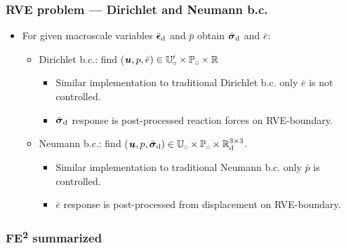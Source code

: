 \documentclass[11pt]{beamer} %
\renewcommand{\dev}{\mathrm{d}}
\newcommand{\rve}{
  {\mathchoice
   {\mbox{\scalebox{0.67}{$\Box$}}}
   {\mbox{\scalebox{0.67}{$\Box$}}}
   {\mbox{\scalebox{0.5}{$\Box$}}}
   {\mbox{\scalebox{0.375}{$\Box$}}}
  }
}
\begin{document}
\begin{frame}
 \frametitle{RVE problem --- Dirichlet and Neumann b.c.}
\begin{itemize}
 \item For given macroscale variables $\bar{\ts\epsilon}_\dev$ and $\bar{p}$ obtain $\bar{\ts\sigma}_\dev$ and $\bar{e}$:
 \begin{itemize}
  \item Dirichlet b.c.: find ($\ta{u},p,\bar{e})\in\set{U}'_\rve\times\set{P}_\rve\times\set R$
  \begin{itemize}
    \item Similar implementation to traditional Dirichlet b.c. only $\bar{e}$ is not controlled.
    \item $\bar{\ts\sigma}_\dev$ response is post-processed reaction forces on RVE-boundary.
  \end{itemize}
  \item Neumann b.c.: find ($\ta{u},p,\bar{\ts\sigma}_\dev)\in\set{U}_\rve\times\set{P}_\rve\times\set{R}^{3\times 3}_\dev$.
  \begin{itemize}
    \item Similar implementation to traditional Neumann b.c. only $\bar{p}$ is controlled.
    \item $\bar{e}$ response is post-processed from displacement on RVE-boundary.
  \end{itemize}
 \end{itemize}
\end{itemize}
\end{frame}

\begin{frame}
 \frametitle{FE\textsuperscript{2} summarized}
\begin{center}
 
\end{center}
\end{frame}
\end{document}
